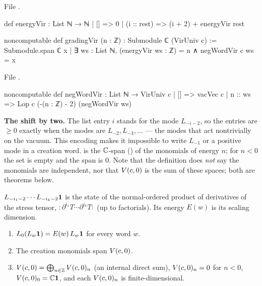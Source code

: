 File .
\begin{leancode}
def energyVir : List ℕ → ℕ
  | [] => 0
  | (i :: rest) => (i + 2) + energyVir rest

noncomputable def gradingVir (n : ℤ) : Submodule ℂ (VirUniv c) :=
  Submodule.span ℂ {x | ∃ ws : List ℕ, (energyVir ws : ℤ) = n ∧ negWordVir c ws = x}
\end{leancode}
File .
\begin{leancode}
noncomputable def negWordVir : List ℕ → VirUniv c
  | [] => vacVec c
  | n :: ws => Lop c (-(n : ℤ) - 2) (negWordVir ws)
\end{leancode}

\begin{dictionary}
\textbf{The shift by two.} The list entry $i$ stands for the mode $L_{-i-2}$, so the entries are
$\ge0$ exactly when the modes are $L_{-2},L_{-3},\dots$ --- the modes that act nontrivially on the
vacuum. This encoding makes it impossible to write $L_{-1}$ or a positive mode in a creation word.
 is the ${\mathbb{C}}$-span () of the monomials of energy $n$; for
$n<0$ the set is empty and the span is $0$. Note that the definition does \emph{not} say the
monomials are independent, nor that $V(c,0)$ is the sum of these spaces; both are theorems below.
\end{dictionary}

\begin{physics}
$L_{-i_1-2}\cdots L_{-i_k-2}\mathbf{1}$ is the state of the normal-ordered product of derivatives of the
stress tensor, ${:}\partial^{i_1}T\cdots\partial^{i_k}T{:}$ (up to factorials). Its energy $E(w)$ is its
scaling dimension.
\end{physics}

\begin{theorem}\label{l06:thm:grading}
\begin{enumerate}
\item $L_0(L_w\mathbf{1}) = E(w)\,L_w\mathbf{1}$ for every word $w$.
\item The creation monomials span $V(c,0)$.
\item $V(c,0) = \bigoplus_{n\in{\mathbb{Z}}}V(c,0)_n$ (an internal direct sum), $V(c,0)_n = 0$ for $n<0$,
  $V(c,0)_0 = {\mathbb{C}}\mathbf{1}$, and each $V(c,0)_n$ is finite-dimensional.
\end{enumerate}
\end{theorem}

